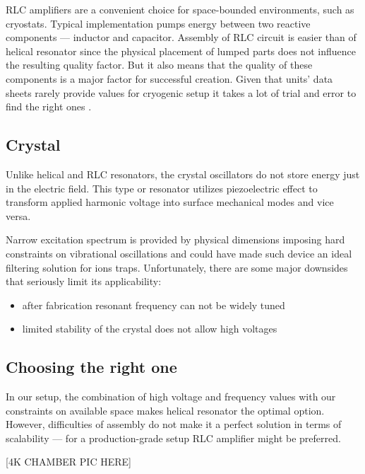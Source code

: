 RLC amplifiers are a convenient choice for space-bounded environments, such as cryostats. Typical implementation pumps energy between two reactive components --- inductor and capacitor. Assembly of RLC circuit is easier than of helical resonator since the physical placement of lumped parts does not influence the resulting quality factor. But it also means that the quality of these components is a major factor for successful creation. Given that units' data sheets rarely provide values for cryogenic setup it takes a lot of trial and error to find the right ones \cite{Gandolfi2010}.
\subsection{Crystal}
Unlike helical and RLC resonators, the crystal oscillators do not store energy just in the electric field. This type or resonator utilizes piezoelectric effect to transform applied harmonic voltage into surface mechanical modes and vice versa.

Narrow excitation spectrum is provided by physical dimensions imposing hard constraints on vibrational oscillations and could have made such device an ideal filtering solution for ions traps. Unfortunately, there are some major downsides that seriously limit its applicability:
\begin{itemize}
	\item after fabrication resonant frequency can not be widely tuned
	\item limited stability of the crystal does not allow high voltages
\end{itemize}
\subsection{Choosing the right one}
In our setup, the combination of high voltage and frequency values with our constraints on available space makes helical resonator the optimal option. However, difficulties of assembly do not make it a perfect solution in terms of scalability --- for a production-grade setup RLC amplifier might be preferred.

[4K CHAMBER PIC HERE]